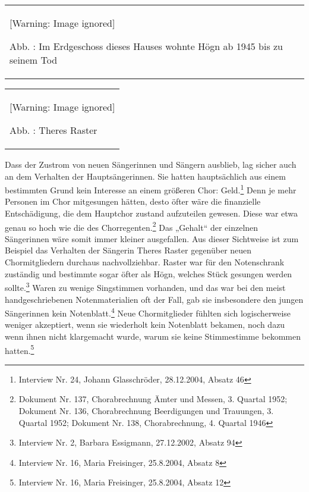 \documentclass[a4paper]{article}
\newcounter{Abb}
\renewcommand\theAbb{\arabic{Abb}}
\begin{document}
\begin{center}
\begin{minipage}{3.491cm}
\begin{flushleft}
\tablefirsthead{}
\tablehead{}
\tabletail{}
\tablelasttail{}
\begin{supertabular}{m{3.291cm}}
  [Warning: Image ignored] %
 
Abb. \stepcounter{Abb}{\theAbb}: Im Erdgeschoss dieses Hauses wohnte
Högn ab 1945 bis zu seinem Tod\\
\end{supertabular}
\end{flushleft}
\end{minipage}
\end{center}
\begin{flushleft}
\tablefirsthead{}
\tablehead{}
\tabletail{}
\tablelasttail{}
\begin{supertabular}{m{4.6330004cm}}

\begin{center}
 [Warning: Image ignored] %

\end{center}
Abb. \stepcounter{Abb}{\theAbb}: Theres Raster\\
\end{supertabular}
\end{flushleft}
Dass der Zustrom von neuen Sängerinnen und Sängern ausblieb, lag sicher
auch an dem Verhalten der Hauptsängerinnen. Sie hatten hauptsächlich
aus einem bestimmten Grund kein Interesse an einem größeren Chor:
Geld.\footnote{ Interview Nr. 24, Johann Glasschröder, 28.12.2004,
Absatz 46} Denn je mehr Personen im Chor mitgesungen hätten, desto
öfter wäre die finanzielle Entschädigung, die dem Hauptchor zustand
aufzuteilen gewesen. Diese war etwa genau so hoch wie die des
Chorregenten.\footnote{ Dokument Nr. 137, Chorabrechnung Ämter und
Messen, 3. Quartal 1952; Dokument Nr. 136, Chorabrechnung Beerdigungen
und Trauungen, 3. Quartal 1952; Dokument Nr. 138, Chorabrechnung, 4.
Quartal 1946} Das „Gehalt“ der einzelnen Sängerinnen wäre somit immer
kleiner ausgefallen. Aus dieser Sichtweise ist zum Beispiel das
Verhalten der Sängerin Theres Raster gegenüber neuen Chormitgliedern
durchaus nachvollziehbar. Raster war für den Notenschrank zuständig und
bestimmte sogar öfter als Högn, welches Stück gesungen werden
sollte.\footnote{ Interview Nr. 2, Barbara Essigmann, 27.12.2002,
Absatz 94} Waren zu wenige Singstimmen vorhanden, und das war bei den
meist handgeschriebenen Notenmaterialien oft der Fall, gab sie
insbesondere den jungen Sängerinnen kein Notenblatt.\footnote{
Interview Nr. 16, Maria Freisinger, 25.8.2004, Absatz 8} Neue
Chormitglieder fühlten sich logischerweise weniger akzeptiert, wenn sie
wiederholt kein Notenblatt bekamen, noch dazu wenn ihnen nicht
klargemacht wurde, warum sie keine Stimmestimme bekommen
hatten.\footnote{ Interview Nr. 16, Maria Freisinger, 25.8.2004, Absatz
12}
\end{document}
